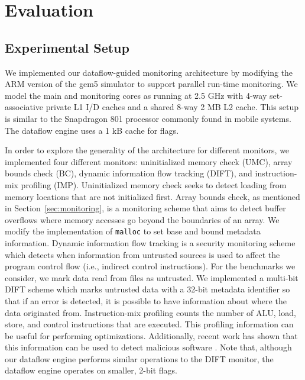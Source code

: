\section{Evaluation}
\label{sec:evaluation}

\subsection{Experimental Setup}
\label{sec:evaluation.setup}

We implemented our dataflow-guided monitoring architecture by
modifying the ARM version of the gem5 simulator \cite{gem5} to support parallel
run-time monitoring. We model the main and monitoring cores as running at 2.5
GHz with 4-way set-associative private L1 I/D caches and a shared 8-way 2 MB L2
cache. This setup is similar to the Snapdragon 801 processor commonly found in
mobile systems. The dataflow engine uses a 1 kB cache for flags.

In order to explore the generality of the architecture for
different monitors, we implemented four different monitors: uninitialized
memory check (UMC), array bounds check (BC), dynamic information flow
tracking (DIFT), and instruction-mix profiling (IMP).  Uninitialized memory
check seeks to detect loading from
memory locations that are not initialized first. Array bounds check, as
mentioned in Section~\ref{sec:monitoring}, is a monitoring scheme that aims to
detect buffer overflows where memory accesses go beyond the boundaries of an
array. We modify the implementation of {\tt malloc} to set base and bound
metadata information. Dynamic information flow tracking is a security
monitoring scheme
which detects when information from untrusted sources is used to affect the
program control flow (i.e., indirect control instructions). For the benchmarks we consider, we mark data read from
files as untrusted. We implemented a multi-bit DIFT scheme which marks
untrusted data with a 32-bit metadata identifier so
that if an error is detected, it is possible to have information about where
the data originated from. Instruction-mix profiling counts the number of ALU,
load, store, and control instructions that are executed. This profiling
information can be useful for performing optimizations. Additionally, recent
work has shown that this information can be used to detect malicious software \cite{tang-raid14}.
Note that, although our dataflow engine performs similar operations to the DIFT
monitor, the dataflow engine operates on smaller, 2-bit flags.


